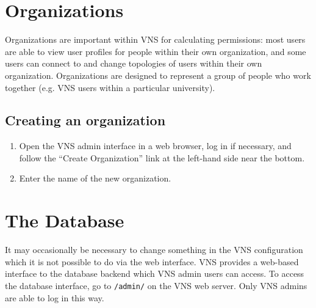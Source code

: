 \documentclass[a4paper,12pt]{report}
\begin{document}
\chapter{Organizations}
Organizations are important within VNS for calculating permissions: most users are able to view user profiles for people within their own organization, and some users can connect to and change topologies of users within their own organization.  Organizations are designed to represent a group of people who work together (e.g. VNS users within a particular university).

\section{Creating an organization}
\begin{enumerate}
\item Open the VNS admin interface in a web browser, log in if necessary, and follow the ``Create Organization'' link at the left-hand side near the bottom.
\item Enter the name of the new organization.
\end{enumerate}


\chapter{The Database}
It may occasionally be necessary to change something in the VNS configuration which it is not possible to do via the web interface.  VNS provides a web-based interface to the database backend which VNS admin users can access.  To access the database interface, go to \texttt{/admin/} on the VNS web server.  Only VNS admins are able to log in this way.
\end{document}
